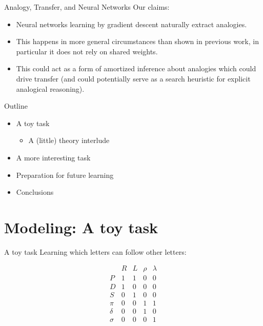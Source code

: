 \documentclass{beamer}
\begin{document}
\begin{frame}{Analogy, Transfer, and Neural Networks}
Our claims:
\begin{itemize}
    \item<1-> Neural networks learning by gradient descent naturally extract analogies. 
    \item<2-> This happens in more general circumstances than shown in previous work, in particular it does not rely on shared weights.
    \item<3-> This could act as a form of amortized inference about analogies which could drive transfer (and could potentially serve as a search heuristic for explicit analogical reasoning).
\end{itemize}
\end{frame}

\begin{frame}{Outline}
\begin{itemize}[<+->]
\item A toy task 
\begin{itemize}
    \item A (little) theory interlude 
\end{itemize}
\item A more interesting task 
\item Preparation for future learning
\item Conclusions
\end{itemize}
\end{frame}
\section{Modeling: A toy task}
\begin{frame}{A toy task}
Learning which letters can follow other letters:\vspace{-2em}
\begin{center}
\[
\begin{array}{c|cccc} 
& R & L & \rho & \lambda \\
\hline
P & 1 & 1 & 0 & 0 \\ 
D & 1 & 0 & 0 & 0 \\
S & 0 & 1 & 0 & 0 \\
\pi    & 0 & 0 & 1 & 1 \\ 
\delta & 0 & 0 & 1 & 0 \\
\sigma & 0 & 0 & 0 & 1 \\
\end{array} 
\]
\end{center}
\end{frame}
\end{document}
